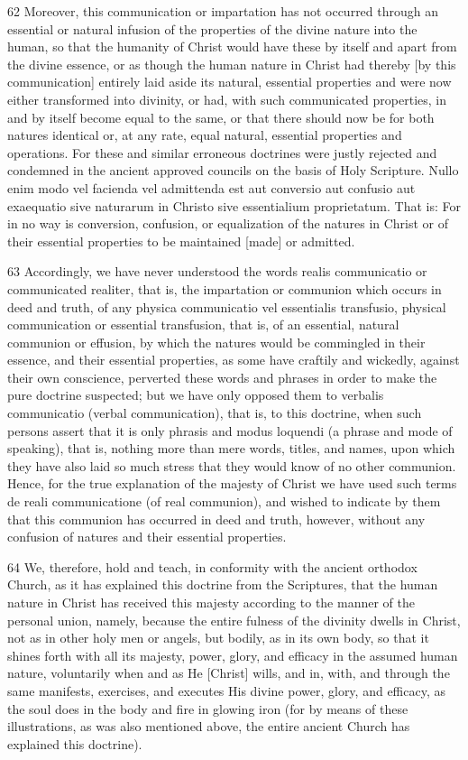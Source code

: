 {62 Moreover, this communication or impartation has not occurred through an essential or natural infusion of the properties of the divine nature into the human, so that the humanity of Christ would have these by itself and apart from the divine essence, or as though the human nature in Christ had thereby [by this communication] entirely laid aside its natural, essential properties and were now either transformed into divinity, or had, with such communicated properties, in and by itself become equal to the same, or that there should now be for both natures identical or, at any rate, equal natural, essential properties and operations. For these and similar erroneous doctrines were justly rejected and condemned in the ancient approved councils on the basis of Holy Scripture. Nullo enim modo vel facienda vel admittenda est aut conversio aut confusio aut exaequatio sive naturarum in Christo sive essentialium proprietatum. That is: For in no way is conversion, confusion, or equalization of the natures in Christ or of their essential properties to be maintained [made] or admitted.

63 Accordingly, we have never understood the words realis communicatio or communicated realiter, that is, the impartation or communion which occurs in deed and truth, of any physica communicatio vel essentialis transfusio, physical communication or essential transfusion, that is, of an essential, natural communion or effusion, by which the natures would be commingled in their essence, and their essential properties, as some have craftily and wickedly, against their own conscience, perverted these words and phrases in order to make the pure doctrine suspected; but we have only opposed them to verbalis communicatio (verbal communication), that is, to this doctrine, when such persons assert that it is only phrasis and modus loquendi (a phrase and mode of speaking), that is, nothing more than mere words, titles, and names, upon which they have also laid so much stress that they would know of no other communion. Hence, for the true explanation of the majesty of Christ we have used such terms de reali communicatione (of real communion), and wished to indicate by them that this communion has occurred in deed and truth, however, without any confusion of natures and their essential properties.

64 We, therefore, hold and teach, in conformity with the ancient orthodox Church, as it has explained this doctrine from the Scriptures, that the human nature in Christ has received this majesty according to the manner of the personal union, namely, because the entire fulness of the divinity dwells in Christ, not as in other holy men or angels, but bodily, as in its own body, so that it shines forth with all its majesty, power, glory, and efficacy in the assumed human nature, voluntarily when and as He [Christ] wills, and in, with, and through the same manifests, exercises, and executes His divine power, glory, and efficacy, as the soul does in the body and fire in glowing iron (for by means of these illustrations, as was also mentioned above, the entire ancient Church has explained this doctrine).

}
